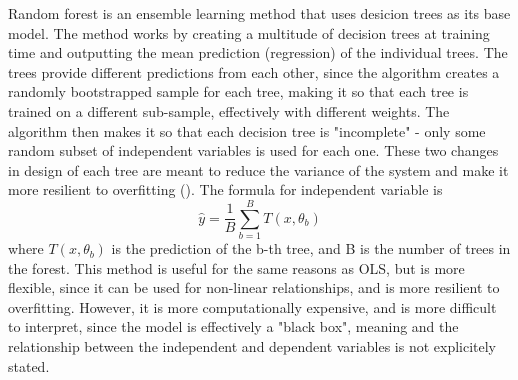 \documentclass[12pt]{report}
\begin{document}
Random forest is an ensemble learning method that uses desicion trees as its base model. The method works by creating a multitude of decision trees at training time and outputting the mean prediction (regression) of the individual trees. The trees provide different predictions from each other, since the algorithm creates a randomly bootstrapped sample for each tree, making it so that each tree is trained on a different sub-sample, effectively with different weights. The algorithm then makes it so that each decision tree is "incomplete" - only some random subset of independent variables is used for each one. These two changes in design of each tree are meant to reduce the variance of the system and make it more resilient to overfitting (\cite{Breiman2001}). The formula for independent variable is 
\begin{equation}
\hat{y} = \frac{1}{B}\sum_{b=1}^{B}T(x, \theta_b)
\end{equation}
where $T(x, \theta_b)$ is the prediction of the b-th tree, and B is the number of trees in the forest. This method is useful for the same reasons as OLS, but is more flexible, since it can be used for non-linear relationships, and is more resilient to overfitting. However, it is more computationally expensive, and is more difficult to interpret, since the model is effectively a "black box", meaning and the relationship between the independent and dependent variables is not explicitely stated.
\end{document}
